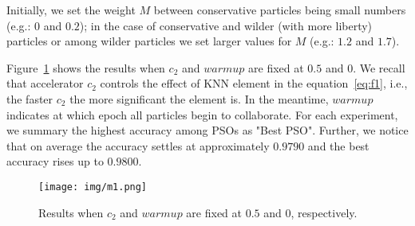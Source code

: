\documentclass{ieeeaccess}
\begin{document}
Initially, we set the weight $M$ between conservative particles being small numbers (e.g.: $0$ and $0.2$); in the case of conservative and wilder (with more liberty) particles or among wilder particles we set larger values for $M$ (e.g.: $1.2$ and $1.7$). 

Figure~\ref{fig:m1} shows the results when $c_2$ and $warmup$ are fixed at $0.5$ and $0$. We recall that accelerator $c_2$ controls the effect of KNN element in the equation~\eqref{eq:f1}, i.e., the faster $c_2$ the more significant the element is. In the meantime, $warmup$ indicates at which epoch all particles begin to collaborate. For each experiment, we summary the highest accuracy among PSOs as "Best PSO". Further, we notice that on average the accuracy settles at approximately $0.9790$ and the best accuracy rises up to $0.9800$.
\begin{figure}[tb!]
\begin{center}
\texttt{[image: img/m1.png]}
\caption{Results when $c_2$ and $warmup$ are fixed at $0.5$ and $0$, respectively.}
\label{fig:m1}
\end{center}
\end{figure}
\end{document}
